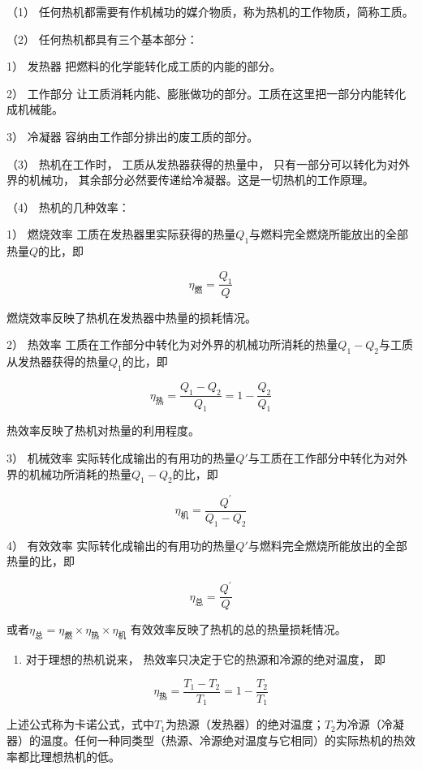 （1） 任何热机都需要有作机械功的媒介物质，称为热机的工作物质，简称工质。

（2） 任何热机都具有三个基本部分：

1） 发热器 把燃料的化学能转化成工质的内能的部分。

2） 工作部分
让工质消耗内能、膨胀做功的部分。工质在这里把一部分内能转化成机械能。

3） 冷凝器 容纳由工作部分排出的废工质的部分。

（3） 热机在工作时， 工质从发热器获得的热量中，
只有一部分可以转化为对外界的机械功，
其余部分必然要传递给冷凝器。这是一切热机的工作原理。

（4） 热机的几种效率：

1） 燃烧效率
工质在发热器里实际获得的热量\(Q_{1}\)与燃料完全燃烧所能放出的全部热量\(Q\)的比，即

\[
\eta_{\text{燃}}=\frac{Q_1}{Q}
\]

燃烧效率反映了热机在发热器中热量的损耗情况。

2） 热效率
工质在工作部分中转化为对外界的机械功所消耗的热量\(Q_{1} - Q_{2}\)与工质从发热器获得的热量\(Q_{1}\)的比，即

\[
\eta_ {\text{热}} = \frac {Q _ {1} - Q _ {2}}{Q _ {1}} = 1 - \frac {Q _ {2}}{Q _ {1}}
\]

热效率反映了热机对热量的利用程度。

3） 机械效率
实际转化成输出的有用功的热量\(Q'\)与工质在工作部分中转化为对外界的机械功所消耗的热量\(Q_{1} - Q_{2}\)的比，即

\[
\eta_{\text{机}}=\frac{Q^\prime}{Q_1-Q_2}
\]

4） 有效效率
实际转化成输出的有用功的热量\(Q'\)与燃料完全燃烧所能放出的全部热量的比，即

\[
\eta_ {\text{总}} = \frac {Q ^ {\prime}}{Q}
\]

或者\(\eta_{\text{总}} = \eta_{\text{燃}} \times \eta_{\text{热}} \times \eta_{\text{机}}\)
有效效率反映了热机的总的热量损耗情况。

\begin{enumerate}
\def\labelenumi{\arabic{enumi}.}
\setcounter{enumi}{5}
\tightlist
\item
  对于理想的热机说来， 热效率只决定于它的热源和冷源的绝对温度， 即
\end{enumerate}

\[
\eta_{\text{热}}=\frac{T_1-T_2}{T_1}=1-\frac{T_2}{T_1}
\]

上述公式称为卡诺公式，式中\(T_{1}\)为热源（发热器）的绝对温度；\(T_{2}\)为冷源（冷凝器）的温度。任何一种同类型（热源、冷源绝对温度与它相同）的实际热机的热效率都比理想热机的低。

